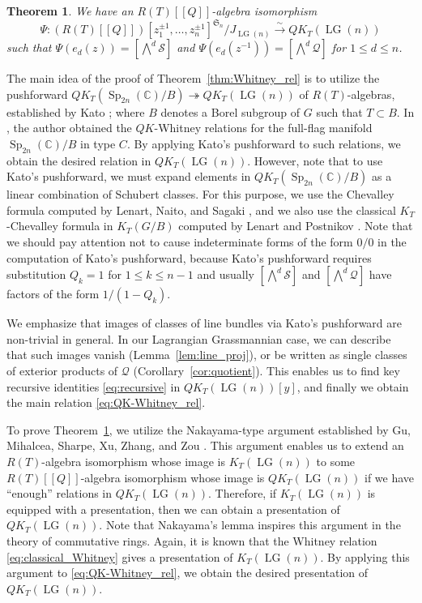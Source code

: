 \documentclass[a4paper, 11pt, reqno]{amsart}
\numberwithin{equation}{section}
\newcommand{\BC}{\mathbb{C}}
\newcommand{\CQ}{\mathcal{Q}}
\newcommand{\CS}{\mathcal{S}}
\newcommand{\Sp}[1]{\operatorname{Sp}_{#1}(\BC)}
\newcommand{\LG}{\operatorname{LG}}
\newcommand{\bra}[1]{[\![ #1 ]\!]}
\newcommand{\class}[1]{\left[ #1 \right]}
\newcommand{\extprod}{\bigwedge\nolimits}
\theoremstyle{plain}
\newtheorem{thm}{Theorem}[section]
\theoremstyle{definition}
\theoremstyle{remark}
\begin{document}
\begin{thm} \label{thm:Whitney_presentation}
We have an $R(T)\bra{Q}$-algebra isomorphism
\begin{equation}
\Psi: (R(T)\bra{Q})[z_{1}^{\pm 1}, \ldots, z_{n}^{\pm 1}]^{\mathfrak{S}_{n}}/J_{\LG(n)} \xrightarrow{\sim} QK_{T}(\LG(n))
\end{equation}
such that $\Psi(e_{d}(z)) = \class{\extprod^{d} \CS}$ and $\Psi(e_{d}(z^{-1})) = \class{\extprod^{d} \CQ}$ for $1 \le d \le n$. 
\end{thm}

The main idea of the proof of Theorem~\ref{thm:Whitney_rel} is to utilize the pushforward $QK_{T}(\Sp{2n}/B) \twoheadrightarrow QK_{T}(\LG(n))$ of $R(T)$-algebras, established by Kato \cite{Kato}; where $B$ denotes a Borel subgroup of $G$ such that $T \subset B$. 
In \cite{Kouno}, the author obtained the $QK$-Whitney relations for the full-flag manifold $\Sp{2n}/B$ in type $C$. 
By applying Kato's pushforward to such relations, we obtain the desired relation in $QK_{T}(\LG(n))$. 
However, note that to use Kato's pushforward, we must expand elements in $QK_{T}(\Sp{2n}/B)$ as a linear combination of Schubert classes. 
For this purpose, we use the Chevalley formula computed by Lenart, Naito, and Sagaki \cite{LNS}, and we also use the classical $K_{T}$-Chevalley formula in $K_{T}(G/B)$ computed by Lenart and Postnikov \cite{LP}. 
Note that we should pay attention not to cause indeterminate forms of the form $0/0$ in the computation of Kato's pushforward, because Kato's pushforward requires substitution $Q_{k} = 1$ for $1 \le k \le n-1$ and usually $\class{\extprod^{d} \CS}$ and $\class{\extprod^{d} \CQ}$ have factors of the form $1/(1-Q_{k})$.

We emphasize that images of classes of line bundles via Kato's pushforward are non-trivial in general. 
In our Lagrangian Grassmannian case, we can describe that such images vanish (Lemma~\ref{lem:line_proj}), or be written as single classes of exterior products of $\CQ$ (Corollary~\ref{cor:quotient}). 
This enables us to find key recursive identities \eqref{eq:recursive} in $QK_{T}(\LG(n))[y]$, and finally we obtain the main relation \eqref{eq:QK-Whitney_rel}.

To prove Theorem~\ref{thm:Whitney_presentation}, we utilize the Nakayama-type argument established by Gu, Mihalcea, Sharpe, Xu, Zhang, and Zou \cite{GMSXZZ2}. 
This argument enables us to extend an $R(T)$-algebra isomorphism whose image is $K_{T}(\LG(n))$ to some $R(T)\bra{Q}$-algebra isomorphism whose image is $QK_{T}(\LG(n))$ if we have ``enough'' relations in $QK_{T}(\LG(n))$. 
Therefore, if $K_{T}(\LG(n))$ is equipped with a presentation, then we can obtain a presentation of $QK_{T}(\LG(n))$. 
Note that Nakayama's lemma inspires this argument in the theory of commutative rings. 
Again, it is known that the Whitney relation \eqref{eq:classical_Whitney} gives a presentation of $K_{T}(\LG(n))$. 
By applying this argument to \eqref{eq:QK-Whitney_rel}, we obtain the desired presentation of $QK_{T}(\LG(n))$. 
\end{document}
